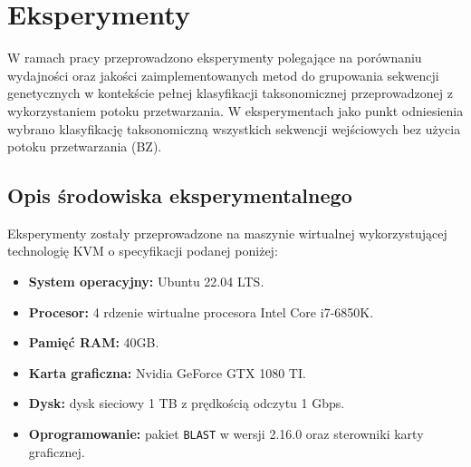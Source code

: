 \cleardoublepage 
\section{Eksperymenty}

    W ramach pracy przeprowadzono eksperymenty polegające na porównaniu wydajności oraz jakości zaimplementowanych metod do grupowania sekwencji genetycznych w kontekście pełnej klasyfikacji taksonomicznej przeprowadzonej z wykorzystaniem potoku przetwarzania. W eksperymentach jako punkt odniesienia wybrano klasyfikację taksonomiczną wszystkich sekwencji wejściowych bez użycia potoku przetwarzania (BZ).

    \subsection{Opis środowiska eksperymentalnego}

        Eksperymenty zostały przeprowadzone na maszynie wirtualnej wykorzystującej technologię KVM o specyfikacji podanej poniżej:



            \begin{itemize}
                \item {
                    \textbf{System operacyjny:} Ubuntu 22.04 LTS.
                }
                \item {
                    \textbf{Procesor:} 4 rdzenie wirtualne procesora Intel Core i7-6850K.
                }
                \item {
                    \textbf{Pamięć RAM:} 40GB.
                }
                \item {
                    \textbf{Karta graficzna:} Nvidia GeForce GTX 1080 TI.
                }
                \item {
                    \textbf{Dysk:} dysk sieciowy 1 TB z prędkością odczytu 1 Gbps.
                }
                \item {
                    \textbf{Oprogramowanie:} pakiet \texttt{BLAST} w wersji 2.16.0 oraz sterowniki karty graficznej.
                }
            \end{itemize}


